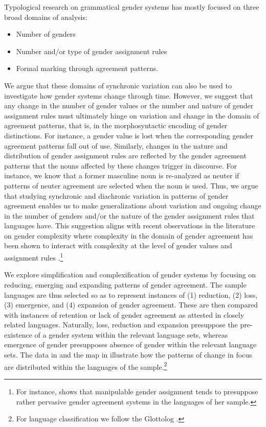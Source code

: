 \documentclass[output=collectionpaper]{langsci/langscibook}
\begin{document}
Typological research on grammatical gender systems  has mostly focused on three broad domains of analysis:
\begin{itemize}
\item Number of genders
\item Number and/or type of gender assignment rules
\item Formal marking through agreement patterns.
\end{itemize}
We argue that these domains of synchronic variation can also be used to investigate how gender systems change through time. However, we suggest that any change in the number of gender values or the number and nature of gender assignment rules must ultimately hinge on variation and change in the domain of agreement patterns, that is, in the morphosyntactic encoding of gender distinctions. For instance, a gender value is lost when the corresponding gender agreement patterns fall out of use. Similarly, changes in the nature and distribution of gender assignment rules are reflected by the gender agreement patterns that the nouns affected by these changes trigger in discourse. For instance, we know that a former masculine noun is re-analyzed as neuter if patterns of neuter agreement are selected when the noun is used. Thus, we argue that studying synchronic and diachronic variation in patterns of gender agreement enables us to make generalizations about variation and ongoing change in the number of genders and/or the nature of the gender assignment rules that languages have. This suggestion aligns with recent observations in the literature on gender complexity where complexity in the domain of gender agreement has been shown to interact with complexity at the level of gender values and assignment rules \citep{Audring2017,DiGarbo2016}.\footnote{For instance, \citet{DiGarbo2016} shows that manipulable gender assignment tends to presuppose rather pervasive gender agreement systems in the languages of her sample.}

We explore simplification and complexification of gender systems by focusing on reducing, emerging and expanding patterns of gender agreement. The sample languages are thus selected so as to represent instances of (1) reduction, (2) loss, (3) emergence, and (4) expansion of gender agreement. These are then compared with instances of retention or lack of gender agreement as attested in closely related languages. Naturally, loss, reduction and expansion presuppose the pre-existence of a gender system within the relevant language sets, whereas emergence of gender presupposes absence of gender within the relevant language sets.  The data in  and the map in  illustrate how the patterns of change in focus are distributed within the languages of the sample.\footnote{For language classification we follow the Glottolog \citep{Hammarstroem2018}.}
\end{document}

